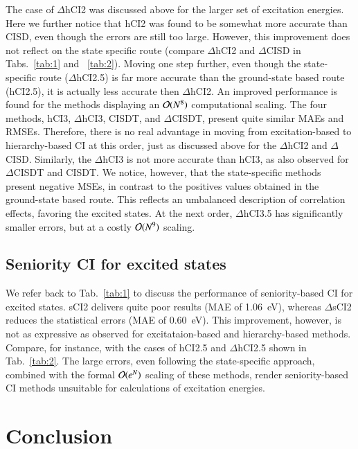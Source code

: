 \documentclass[aip,jcp,reprint,noshowkeys,superscriptaddress]{revtex4-1}
\begin{document}
The case of $\Delta$hCI2 was discussed above for the larger set of excitation energies.
Here we further notice that hCI2 was found to be somewhat more accurate than CISD, even though the errors are still too large.
However, this improvement does not reflect on the state specific route (compare $\Delta$hCI2 and $\Delta$CISD in Tabs.~\ref{tab:1} and ~\ref{tab:2}).
Moving one step further, even though the state-specific route ($\Delta$hCI2.5) is far more accurate than the ground-state based route (hCI2.5),
it is actually less accurate then $\Delta$hCI2.
An improved performance is found for the methods displaying an $\order*{N^8}$ computational scaling.
The four methods, hCI3, $\Delta$hCI3, CISDT, and $\Delta$CISDT, present quite similar MAEs and RMSEs.
Therefore, there is no real advantage in moving from excitation-based to hierarchy-based CI at this order, just as discussed above for the $\Delta$hCI2 and $\Delta$CISD.
Similarly, the $\Delta$hCI3 is not more accurate than hCI3, as also observed for $\Delta$CISDT and CISDT. \cite{Kossoski_2023}
We notice, however, that the state-specific methods present negative MSEs, in contrast to the positives values obtained in the ground-state based route.
This reflects an umbalanced description of correlation effects, favoring the excited states.
At the next order, $\Delta$hCI3.5 has significantly smaller errors, but at a costly $\order*{N^9}$ scaling.



\subsection{Seniority CI for excited states}
\label{sec:res_C}

We refer back to Tab.~\ref{tab:1} to discuss the performance of seniority-based CI for excited states.
sCI2 delivers quite poor results (MAE of \SI{1.06}{eV}), whereas $\Delta$sCI2 reduces the statistical errors (MAE of \SI{0.60}{eV}).
This improvement, however, is not as expressive as observed for excitataion-based and hierarchy-based methods.
Compare, for instance, with the cases of hCI2.5 and $\Delta$hCI2.5 shown in Tab.~\ref{tab:2}.
The large errors, even following the state-specific approach, combined with the formal $\order*{e^N}$ scaling of these methods,
render seniority-based CI methods unsuitable for calculations of excitation energies.


\section{Conclusion}
\label{sec:ccl}
\end{document}
